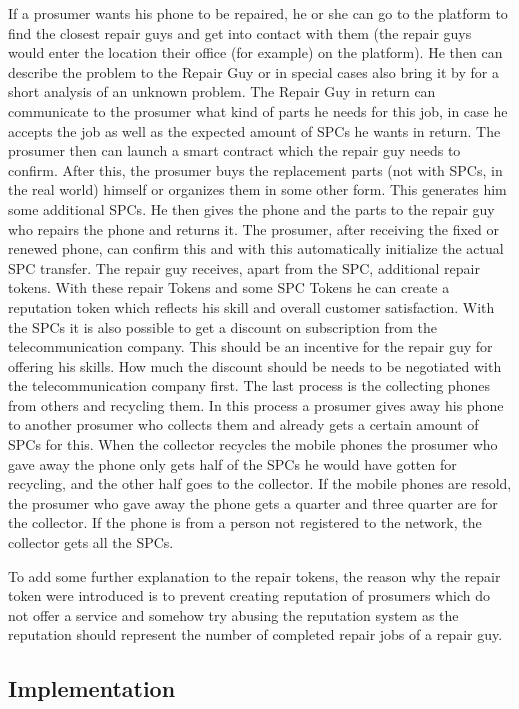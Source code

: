 \documentclass[11pt]{scrartcl}
\begin{document}
If a prosumer wants his phone to be repaired, he or she can go to the platform to find the closest repair guys and get into contact with them (the repair guys would enter the location their office (for example) on the platform). He then can describe the problem to the Repair Guy or in special cases also bring it by for a short analysis of an unknown problem. The Repair Guy in return can communicate to the prosumer what kind of parts he needs for this job, in case he accepts the job as well as the expected amount of SPCs he wants in return. The prosumer then can launch a smart contract which the repair guy needs to confirm. After this, the prosumer buys the replacement parts (not with SPCs, in the real world) himself or organizes them in some other form. This generates him some additional SPCs. He then gives the phone and the parts to the repair guy who repairs the phone and returns it. The prosumer, after receiving the fixed or renewed phone, can confirm this and with this automatically initialize the actual SPC transfer. The repair guy receives, apart from the SPC, additional repair tokens. With these repair Tokens and some SPC Tokens he can create a reputation token which reflects his skill and overall customer satisfaction. With the SPCs it is also possible to get a discount on subscription from the telecommunication company. This should be an incentive for the repair guy for offering his skills. How much the discount should be needs to be negotiated with the telecommunication company first. The last process is the collecting phones from others and recycling them. In this process a prosumer gives away his phone to another prosumer who collects them and already gets a certain amount of SPCs for this. When the collector recycles the mobile phones the prosumer who gave away the phone only gets half of the SPCs he would have gotten for recycling, and the other half goes to the collector. If the mobile phones are resold, the prosumer who gave away the phone gets a quarter and three quarter are for the collector. If the phone is from a person not registered to the network, the collector gets all the SPCs.

To add some further explanation to the repair tokens, the reason why the repair token were introduced is to prevent creating reputation of prosumers which do not offer a service and somehow try abusing the reputation system as the reputation should represent the number of completed repair jobs of a repair guy.

\subsection{Implementation}
\end{document}
